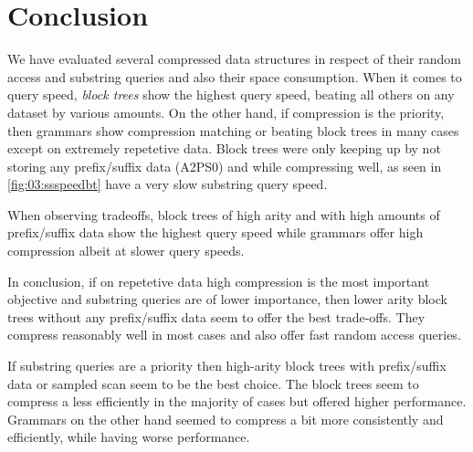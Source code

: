 \section{Conclusion}

We have evaluated several compressed data structures in respect of their random access and substring queries and also their space consumption.
When it comes to query speed, \emph{block trees} show the highest query speed, beating all others on any dataset by various amounts.
On the other hand, if compression is the priority, then grammars show compression matching or beating block trees in many cases except on extremely repetetive data.
Block trees were only keeping up by not storing any prefix/suffix data (A2PS0) and while compressing well, as seen in \cref{fig:03:ssspeedbt} have a very slow substring query speed.

When observing tradeoffs, block trees of high arity and with high amounts of prefix/suffix data show the highest query speed while grammars offer high compression albeit at slower query speeds.

In conclusion, if on repetetive data high compression is the most important objective and substring queries are of lower importance,
then lower arity block trees without any prefix/suffix data seem to offer the best trade-offs.
They compress reasonably well in most cases and also offer fast random access queries.

If substring queries are a priority then high-arity block trees with prefix/suffix data or sampled scan seem to be the best choice.
The block trees seem to compress a less efficiently in the majority of cases but offered higher performance.
Grammars on the other hand seemed to compress a bit more consistently and efficiently, while having worse performance.
